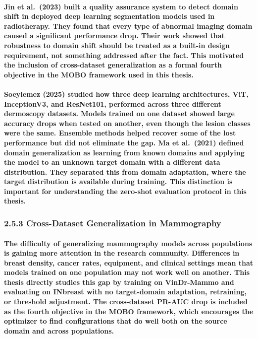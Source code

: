 \paragraph{Jin et al. (2023) built a quality assurance system to detect domain shift in deployed deep learning segmentation models used in radiotherapy. They found that every type of abnormal imaging domain caused a significant performance drop. Their work showed that robustness to domain shift should be treated as a built-in design requirement, not something addressed after the fact. This motivated the inclusion of cross-dataset generalization as a formal fourth objective in the MOBO framework used in this thesis.}

\paragraph{Soeylemez (2025) studied how three deep learning architectures, ViT, InceptionV3, and ResNet101, performed across three different dermoscopy datasets. Models trained on one dataset showed large accuracy drops when tested on another, even though the lesion classes were the same. Ensemble methods helped recover some of the lost performance but did not eliminate the gap. Ma et al. (2021) defined domain generalization as learning from known domains and applying the model to an unknown target domain with a different data distribution. They separated this from domain adaptation, where the target distribution is available during training. This distinction is important for understanding the zero-shot evaluation protocol in this thesis.}

\subsubsection{2.5.3 Cross-Dataset Generalization in
Mammography}\label{cross-dataset-generalization-in-mammography}

\paragraph{The difficulty of generalizing mammography models across populations is gaining more attention in the research community. Differences in breast density, cancer rates, equipment, and clinical settings mean that models trained on one population may not work well on another. This thesis directly studies this gap by training on VinDr-Mammo and evaluating on INbreast with no target-domain adaptation, retraining, or threshold adjustment. The cross-dataset PR-AUC drop is included as the fourth objective in the MOBO framework, which encourages the optimizer to find configurations that do well both on the source domain and across populations.}

